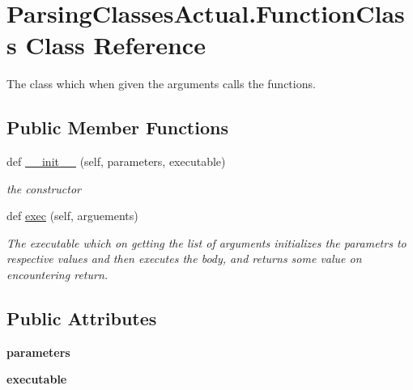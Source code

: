 \hypertarget{class_parsing_classes_actual_1_1_function_class}{}\section{Parsing\+Classes\+Actual.\+Function\+Class Class Reference}
\label{class_parsing_classes_actual_1_1_function_class}


The class which when given the arguments calls the functions.  


\subsection*{Public Member Functions}
\begin{DoxyCompactItemize}
\item 
def \hyperlink{class_parsing_classes_actual_1_1_function_class_a4e12c7299b05b08c94ab18a69bf06c37}{\+\_\+\+\_\+init\+\_\+\+\_\+} (self, parameters, executable)
\begin{DoxyCompactList}\small\item\em the constructor \end{DoxyCompactList}\item 
def \hyperlink{class_parsing_classes_actual_1_1_function_class_a575c7098fc5b04f2df2791a137f596c4}{exec} (self, arguements)
\begin{DoxyCompactList}\small\item\em The executable which on getting the list of arguments initializes the parametrs to respective values and then executes the body, and returns some value on encountering return. \end{DoxyCompactList}\end{DoxyCompactItemize}
\subsection*{Public Attributes}
\begin{DoxyCompactItemize}
\item 
{\bfseries parameters}\hypertarget{class_parsing_classes_actual_1_1_function_class_a0b2facf5cf3be8053e031a6e157dd3a0}{}\label{class_parsing_classes_actual_1_1_function_class_a0b2facf5cf3be8053e031a6e157dd3a0}

\item 
{\bfseries executable}\hypertarget{class_parsing_classes_actual_1_1_function_class_ad575e3f6477182c328f58f2f58c4e388}{}\label{class_parsing_classes_actual_1_1_function_class_ad575e3f6477182c328f58f2f58c4e388}

\end{DoxyCompactItemize}


